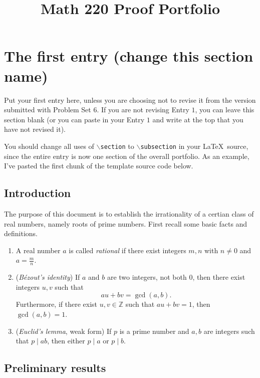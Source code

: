 \documentclass[12pt]{article}
\theoremstyle{definition}
\begin{document}
\title{Math 220 Proof Portfolio}
\date{}

\maketitle


\section{The first entry (change this section name)}

Put your first entry here, unless you are choosing not to revise it from the version submitted with Problem Set $6$. If you are not revising Entry $1$, you can leave this section blank (or you can paste in your Entry $1$ and write at the top that you have not revised it).

You should change all uses of \texttt{$\backslash$section} to \texttt{$\backslash$subsection} in your \LaTeX\ source, since the entire entry is now one section of the overall portfolio. As an example, I've pasted the first chunk of the template source code below.

\subsection*{Introduction}

The purpose of this document is to establish the irrationality of a certian class of real numbers, namely roots of prime numbers. First recall some basic facts and definitions.

\begin{enumerate}
\item
A real number $a$ is called \textit{rational} if there exist integers $m,n$ with $n \neq 0$ and  $ a = \frac{m}{n}$.
\item
(\textit{B\'ezout's identity})
If $a$ and $b$ are two integers, not both $0$, then there exist integers $u,v$ such that
$$a u + bv = \gcd(a,b).$$
Furthermore, if there exist $u,v \in \mathbb{Z}$ such that $au+bv=1$, then $\gcd(a,b) = 1$.
\item
(\textit{Euclid's lemma}, weak form)
If $p$ is a prime number and $a,b$ are integers such that $p \mid ab$, then either $p \mid a$ or $p \mid b$.
\end{enumerate}

\subsection{Preliminary results}
\end{document}
